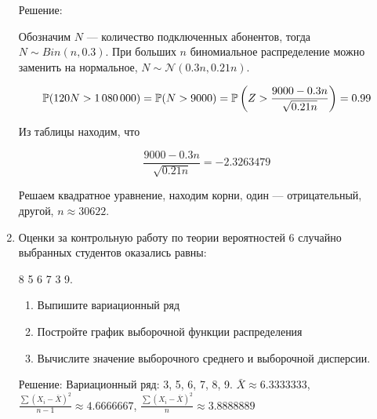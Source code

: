 \documentclass[12pt, a4paper]{article}\usepackage[]{graphicx}\usepackage[]{color}
\makeatletter
\newenvironment{kframe}{%
 \def\at@end@of@kframe{}%
 \ifinner\ifhmode%
  \def\at@end@of@kframe{\end{minipage}}%
  \begin{minipage}{\columnwidth}%
 \fi\fi%
 \def\FrameCommand##1{\hskip\@totalleftmargin \hskip-\fboxsep
 \colorbox{shadecolor}{##1}\hskip-\fboxsep
     \hskip-\linewidth \hskip-\@totalleftmargin \hskip\columnwidth}%
 \MakeFramed {\advance\hsize-\width
   \@totalleftmargin\z@ \linewidth\hsize
   \@setminipage}}%
 {\par\unskip\endMakeFramed%
 \at@end@of@kframe}
\newcommand{\cN}{\mathcal{N}}
\makeatother
\begin{document}
\begin{enumerate}
Решение:

Обозначим $N$ — количество подключенных абонентов, тогда $N\sim Bin(n,0.3)$. При больших $n$ биномиальное распределение можно заменить на нормальное, $N\sim \cN(0.3n,0.21n)$.

\[ \P(120N>1\,080\,000)=\P(N>9000)=\P\left(Z>\frac{9000-0.3n}{\sqrt{0.21n}}\right)=0.99 \]

Из таблицы находим, что

\[ \frac{9000-0.3n}{\sqrt{0.21n}}=-2.3263479\]



Решаем квадратное уравнение, находим корни, один — отрицательный, другой, $n\approx 30622$.



\item Оценки за контрольную работу по теории вероятностей 6 случайно выбранных студентов оказались равны:

8 5 6 7 3 9.

\begin{enumerate}
\item Выпишите вариационный ряд
\item Постройте график выборочной функции распределения
\item Вычислите значение выборочного среднего и выборочной дисперсии.
\end{enumerate}




Решение: Вариационный ряд: 3, 5, 6, 7, 8, 9. $\bar{X}\approx 6.3333333$,
$\frac{\sum (X_i-\bar{X})^2}{n-1}\approx 4.6666667$,
$\frac{\sum (X_i-\bar{X})^2}{n}\approx 3.8888889$





\begin{kframe}



\end{kframe}
\end{enumerate}
\end{document}
